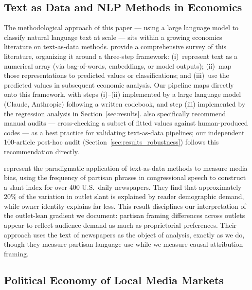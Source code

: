 \documentclass[12pt]{article}
\begin{document}
\subsection*{Text as Data and NLP Methods in Economics}

The methodological approach of this paper --- using a large language
model to classify natural language text at scale --- sits within a
growing economics literature on text-as-data methods.
\citet{gentzkow2019} provide a comprehensive survey of this literature,
organizing it around a three-step framework: (i)~represent text as a
numerical array (via bag-of-words, embeddings, or model outputs);
(ii)~map those representations to predicted values or classifications;
and (iii)~use the predicted values in subsequent economic analysis.
Our pipeline maps directly onto this framework, with steps (i)--(ii)
implemented by a large language model (Claude, Anthropic) following a
written codebook, and step (iii) implemented by the regression analysis
in Section~\ref{sec:results}.  \citet{gentzkow2019} also specifically
recommend manual audits --- cross-checking a subset of fitted values
against human-produced codes --- as a best practice for validating
text-as-data pipelines; our independent 100-article post-hoc audit
(Section~\ref{sec:results_robustness}) follows this recommendation
directly.

\citet{gentzkow2010} represent the paradigmatic application of
text-as-data methods to measure media bias, using the frequency of
partisan phrases in congressional speech to construct a slant index for
over 400 U.S.\ daily newspapers.  They find that approximately 20\% of
the variation in outlet slant is explained by reader demographic demand,
while owner identity explains far less.  This result disciplines our
interpretation of the outlet-lean gradient we document: partisan framing
differences across outlets appear to reflect audience demand as much as
proprietorial preferences.  Their approach uses the text of newspapers
as the object of analysis, exactly as we do, though they measure
partisan language use while we measure causal attribution framing.

\subsection*{Political Economy of Local Media Markets}
\end{document}
